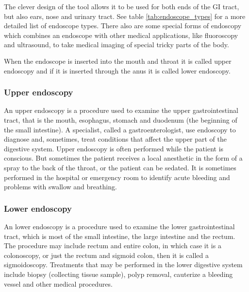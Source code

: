 \documentclass[thesis.tex]{subfiles}
\begin{document}
The clever design of the tool allows it to be used for both ends of the GI tract, but also ears, nose and urinary tract. See table \ref{tab:endoscope_types} for a more detailed list of endoscope types. There also are some special forms of endoscopy which combines an endoscope with other medical applications, like fluoroscopy and ultrasound, to take medical imaging of special tricky parts of the body.

\medbreak
When the endoscope is inserted into the mouth and throat it is called upper endoscopy and if it is inserted through the anus it is called lower endoscopy. 

\subsubsection{Upper endoscopy}
An upper endoscopy is a procedure used to examine the upper gastrointestinal tract, that is the mouth, esophagus, stomach and duodenum (the beginning of the small intestine). A specialist, called a gastroenterologist, use endoscopy to diagnose and, sometimes, treat conditions that affect the upper part of the digestive system. Upper endoscopy is often performed while the patient is conscious. But sometimes the patient receives a local anesthetic in the form of a spray to the back of the throat, or the patient can be sedated. It is sometimes performed in the hospital or emergency room to identify acute bleeding and problems with swallow and breathing.

\subsubsection{Lower endoscopy}
An lower endoscopy is a procedure used to examine the lower gastrointestinal tract, which is  most of the small intestine, the large intestine and the rectum. The procedure may include rectum and entire colon, in which case it is a colonoscopy, or just the rectum and sigmoid colon, then it is called a sigmoidoscopy. Treatments that may be performed in the lower digestive system include biopsy (collecting tissue sample), polyp removal, cauterize a bleeding vessel and other medical procedures.
\bigbreak \noindent
\end{document}
